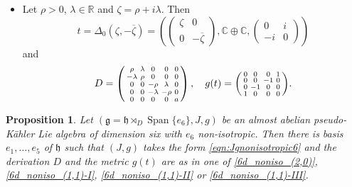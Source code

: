 \documentclass{article}
\newtheorem{proposition}[theorem]{Proposition}
\theoremstyle{definition}
\newcommand{\R}{\mathbb{R}}
\newcommand{\C}{\mathbb{C}}
\newcommand{\frg}{\mathfrak{g}}
\newcommand{\frh}{\mathfrak{h}}
\newcommand{\Span}[1]{\operatorname{Span}\{#1\}}
\newenvironment{smallpmatrix}{\left(\begin{smallmatrix}}{\end{smallmatrix}\right)}
\begin{document}
\begin{itemize}
\begin{equation}
\begin{smallmatrix}
        0 & 0 & -\lambda_2 & 0 & 0 \\
        0 & 0 & 0 & 0 & a
    \end{smallmatrix}\right),\quad g(t)=\begin{smallpmatrix}
        1 & 0 & 0 & 0 \\
        0 & 1 & 0 & 0 \\
        0 & 0 & -1 & 0 \\
        0 & 0 & 0 & -1
    \end{smallpmatrix}.\end{equation}
    \item Let $\rho>0$, $\lambda\in\R$ and $\zeta=\rho+i\lambda$. Then $$t=\Delta_0(\zeta,-\overline{\zeta})=\left(\begin{pmatrix}
        \zeta&0\\
        0&-\overline{\zeta}
    \end{pmatrix},\C\oplus\C,\begin{pmatrix}
        0&i\\
        -i&0
    \end{pmatrix}\right)$$ and \begin{equation}\label{6d_noniso_(1,1)-III}
        D=\left(\begin{smallmatrix}
        \rho&\lambda&0&0&0\\
        -\lambda&\rho&0&0&0\\
        0&0&-\rho&\lambda&0\\
        0&0&-\lambda&-\rho&0\\
        0&0&0&0&a
    \end{smallmatrix}\right),\quad g(t)=\begin{smallpmatrix}
        0 & 0 & 0 & 1 \\
        0 & 0 & -1 & 0 \\
        0 & -1 & 0 & 0 \\
        1 & 0 & 0 & 0
    \end{smallpmatrix}.\end{equation}
\end{itemize}

\begin{proposition}\label{prop:class_6d_non-isotropic}
    Let $(\frg=\frh\rtimes_D{\Span{e_6}},J,g)$ be an almost abelian pseudo-Kähler Lie algebra of dimension six with $e_6$ non-isotropic. Then there is basis $e_1,\dotsc, e_5$ of $\frh$ such that $(J,g)$ takes the form \eqref{eqn:Jgnonisotropic6} and the derivation $D$ and the metric $g(t)$ are as in one of \eqref{6d_noniso_(2,0)}, \eqref{6d_noniso_(1,1)-I}, \eqref{6d_noniso_(1,1)-II} or \eqref{6d_noniso_(1,1)-III}.
\end{proposition}
\end{document}
